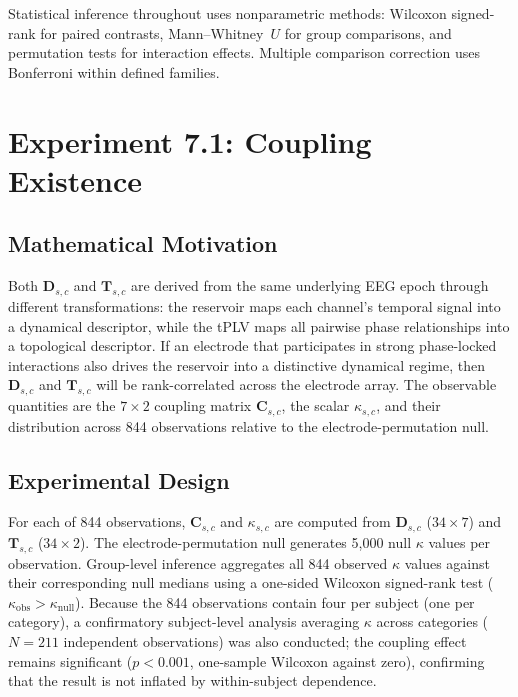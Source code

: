 Statistical inference throughout uses nonparametric methods: Wilcoxon signed-rank for paired contrasts, Mann--Whitney~$U$ for group comparisons, and permutation tests for interaction effects. Multiple comparison correction uses Bonferroni within defined families.


\section{Experiment 7.1: Coupling Existence}
\label{sec:exp7_coupling}

\subsection{Mathematical Motivation}

Both $\mathbf{D}_{s,c}$ and $\mathbf{T}_{s,c}$ are derived from the same underlying EEG epoch through different transformations: the reservoir maps each channel's temporal signal into a dynamical descriptor, while the tPLV maps all pairwise phase relationships into a topological descriptor. If an electrode that participates in strong phase-locked interactions also drives the reservoir into a distinctive dynamical regime, then $\mathbf{D}_{s,c}$ and $\mathbf{T}_{s,c}$ will be rank-correlated across the electrode array. The observable quantities are the $7 \times 2$ coupling matrix $\mathbf{C}_{s,c}$, the scalar $\kappa_{s,c}$, and their distribution across 844 observations relative to the electrode-permutation null.

\subsection{Experimental Design}

For each of 844 observations, $\mathbf{C}_{s,c}$ and $\kappa_{s,c}$ are computed from $\mathbf{D}_{s,c}$ ($34 \times 7$) and $\mathbf{T}_{s,c}$ ($34 \times 2$). The electrode-permutation null generates 5,000 null $\kappa$ values per observation. Group-level inference aggregates all 844 observed $\kappa$ values against their corresponding null medians using a one-sided Wilcoxon signed-rank test ($\kappa_{\text{obs}} > \kappa_{\text{null}}$). Because the 844 observations contain four per subject (one per category), a confirmatory subject-level analysis averaging $\kappa$ across categories ($N = 211$ independent observations) was also conducted; the coupling effect remains significant ($p < 0.001$, one-sample Wilcoxon against zero), confirming that the result is not inflated by within-subject dependence.

